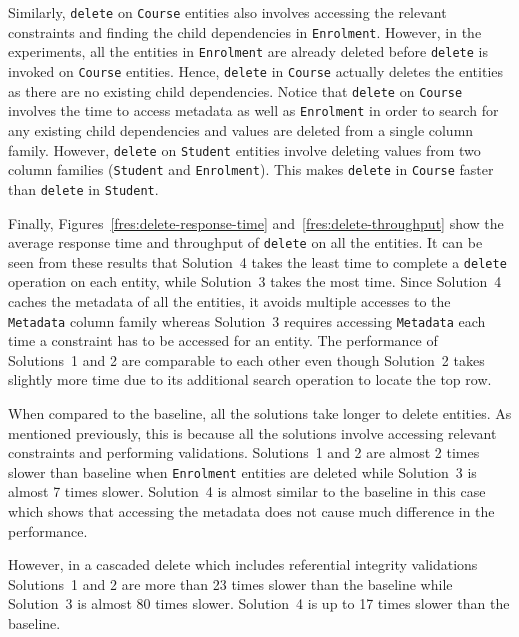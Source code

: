 Similarly, \texttt{delete} on \texttt{Course} entities also involves accessing
the relevant constraints and finding the child dependencies in
\texttt{Enrolment}. However, in the experiments,  all the entities in
\texttt{Enrolment} are already deleted before \texttt{delete} is invoked on
\texttt{Course} entities. Hence, \texttt{delete} in \texttt{Course} actually
deletes the entities as there are no existing child dependencies.
Notice that \texttt{delete} on \texttt{Course} involves the time to access
metadata as well as \texttt{Enrolment} in order to search for any existing child
dependencies and values are deleted from a single column family. However,
\texttt{delete} on \texttt{Student} entities involve deleting values from two
column families (\texttt{Student} and \texttt{Enrolment}). This
makes \texttt{delete} in \texttt{Course} faster than \texttt{delete} in
\texttt{Student}.

Finally, Figures~\ref{fres:delete-response-time}
and~\ref{fres:delete-throughput} show the average response time and throughput
of \texttt{delete} on all the entities. It can be seen from these results that
Solution~4 takes the least time to complete a \texttt{delete} operation on each
entity, while Solution~3 takes the most time. Since Solution~4 caches the
metadata of all the entities, it avoids multiple accesses to the
\texttt{Metadata} column family whereas Solution~3 requires accessing
\texttt{Metadata} each time a constraint has to be accessed for an entity. The
performance of Solutions~1 and 2 are comparable to each other even though
Solution~2 takes slightly more time due to its additional search operation to
locate the top row.

When compared to the baseline, all the solutions take longer to delete entities.
As mentioned previously, this is because all the solutions involve accessing
relevant constraints and performing validations.
Solutions~1 and 2 are almost 2 times slower than baseline  when
\texttt{Enrolment} entities are deleted while Solution~3 is almost 7 times
slower. Solution~4 is almost similar to the baseline in this case  which shows
that accessing the metadata does not cause much difference in the performance.


However, in a cascaded delete which includes referential integrity validations
Solutions~1 and 2 are more than 23 times slower than the
baseline while Solution~3 is almost 80
times slower. Solution~4  is up to 17 times slower than the baseline.



